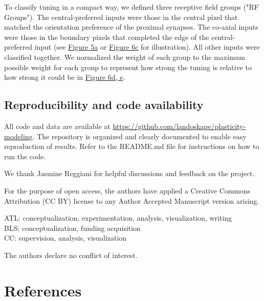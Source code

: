 \documentclass[twocolumn]{theme/bioRxiv}
\begin{document}
To classify tuning in a compact way, we defined three receptive field groups ("RF Groups"). The central-preferred inputs were those in the central pixel that matched the orientation preference of the proximal synapses. The co-axial inputs were those in the boundary pixels that completed the edge of the central-preferred input (see \hyperref[fig:5]{Figure 5a} or \hyperref[fig:6]{Figure 6c} for illustration). All other inputs were classified together. We normalized the weight of each group to the maximum possible weight for each group to represent how strong the tuning is relative to how strong it could be in \hyperref[fig:6]{Figure 6d, e}. 

\subsection*{Reproducibility and code availability}
All code and data are available at \url{https://github.com/landoskape/plasticity-modeling}. The repository is organized and clearly documented to enable easy reproduction of results. Refer to the README.md file for instructions on how to run the code.

\begin{acknowledgements}
We thank Jasmine Reggiani for helpful discussions and feedback on the project. 

For the purpose of open access, the authors have applied a Creative Commons Attribution (CC BY) license to any Author Accepted Manuscript version arising.
\end{acknowledgements}

\begin{contributions}
ATL: conceptualization, experimentation, analysis, visualization, writing \\
BLS: conceptualization, funding acquisition \\
CC: supervision, analysis, visualization \\
\end{contributions}

\begin{interests}
The authors declare no conflict of interest.
\end{interests}

\section*{References}

% 


 \newpage 
% 
% 
% 
\end{document}
